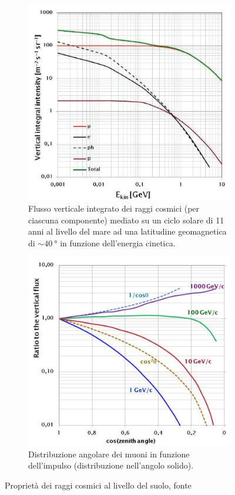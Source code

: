 \begin{figure}
	\begin{subfigure}[t]{0.48\textwidth}
		\centering
		\includegraphics[width=\textwidth]{vertical_flux}
		\caption{\label{fig:vertical_flux}
		Flusso verticale integrato dei raggi cosmici (per ciascuna componente)
		mediato su un ciclo solare di 11 anni al livello del mare
		ad una latitudine geomagnetica di $\sim \SI{40}{\degree}$ in funzione dell'energia cinetica.}
	\end{subfigure}
	\hfill
	\begin{subfigure}[t]{0.48\textwidth}
		\centering
		\includegraphics[width=\textwidth]{angular_distribution}
		\caption{\label{fig:angular_distribution}
		Distribuzione angolare dei muoni in funzione dell'impulso
		(distribuzione nell'angolo solido).}
	\end{subfigure}
	\caption{\label{fig:vertical_angular}
	Proprietà dei raggi cosmici al livello del suolo, fonte \cite{1}}
\end{figure}

